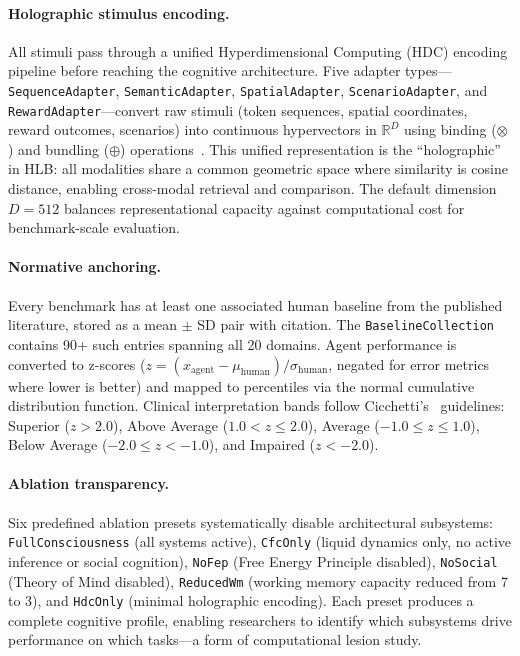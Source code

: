 \documentclass[11pt,letterpaper]{article}
\newcommand{\bind}{\otimes}
\newcommand{\bundle}{\oplus}
\newcommand{\hlb}{\textsc{HLB}}
\begin{document}
\paragraph{Holographic stimulus encoding.} All stimuli pass through a unified Hyperdimensional Computing (HDC) encoding pipeline before reaching the cognitive architecture. Five adapter types---\texttt{SequenceAdapter}, \texttt{SemanticAdapter}, \texttt{SpatialAdapter}, \texttt{ScenarioAdapter}, and \texttt{RewardAdapter}---convert raw stimuli (token sequences, spatial coordinates, reward outcomes, scenarios) into continuous hypervectors in $\mathbb{R}^D$ using binding ($\bind$) and bundling ($\bundle$) operations~\citep{kleyko2023survey}. This unified representation is the ``holographic'' in \hlb{}: all modalities share a common geometric space where similarity is cosine distance, enabling cross-modal retrieval and comparison. The default dimension $D = 512$ balances representational capacity against computational cost for benchmark-scale evaluation.

\paragraph{Normative anchoring.} Every benchmark has at least one associated human baseline from the published literature, stored as a mean $\pm$ SD pair with citation. The \texttt{BaselineCollection} contains 90+ such entries spanning all 20 domains. Agent performance is converted to z-scores ($z = (x_{\text{agent}} - \mu_{\text{human}}) / \sigma_{\text{human}}$, negated for error metrics where lower is better) and mapped to percentiles via the normal cumulative distribution function. Clinical interpretation bands follow Cicchetti's~\citep{cicchetti1994guidelines} guidelines: Superior ($z > 2.0$), Above Average ($1.0 < z \leq 2.0$), Average ($-1.0 \leq z \leq 1.0$), Below Average ($-2.0 \leq z < -1.0$), and Impaired ($z < -2.0$).

\paragraph{Ablation transparency.} Six predefined ablation presets systematically disable architectural subsystems: \texttt{FullConsciousness} (all systems active), \texttt{CfcOnly} (liquid dynamics only, no active inference or social cognition), \texttt{NoFep} (Free Energy Principle disabled), \texttt{NoSocial} (Theory of Mind disabled), \texttt{ReducedWm} (working memory capacity reduced from 7 to 3), and \texttt{HdcOnly} (minimal holographic encoding). Each preset produces a complete cognitive profile, enabling researchers to identify which subsystems drive performance on which tasks---a form of computational lesion study.
\end{document}
